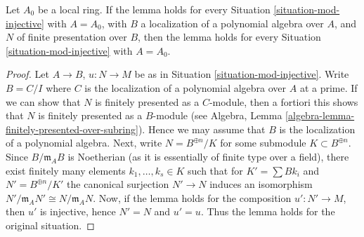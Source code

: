 \begin{lemma}
\label{lemma-reduce-finite-type-injective-into-flat-mod-m}
Let $A_0$ be a local ring. If the lemma holds for every
Situation \ref{situation-mod-injective} with $A = A_0$, with $B$ a
localization of a polynomial algebra over $A$, and $N$ of finite presentation
over $B$, then the lemma holds for every
Situation \ref{situation-mod-injective} with $A = A_0$.
\end{lemma}

\begin{proof}
Let $A \to B$, $u : N \to M$ be as in Situation \ref{situation-mod-injective}.
Write $B = C/I$ where $C$ is the localization of a polynomial algebra
over $A$ at a prime. If we can show that $N$ is finitely presented as
a $C$-module, then a fortiori this shows that $N$ is finitely presented
as a $B$-module (see
Algebra, Lemma \ref{algebra-lemma-finitely-presented-over-subring}).
Hence we may assume that $B$ is the localization of a polynomial algebra.
Next, write $N = B^{\oplus n}/K$ for some submodule $K \subset B^{\oplus n}$.
Since $B/\mathfrak m_AB$ is Noetherian (as it is essentially of finite type
over a field), there exist finitely many elements $k_1, \ldots, k_s \in K$
such that for $K' = \sum Bk_i$ and $N' = B^{\oplus n}/K'$ the
canonical surjection $N' \to N$ induces an isomorphism
$N'/\mathfrak m_AN' \cong N/\mathfrak m_AN$.
Now, if the lemma holds for the composition $u' : N' \to M$,
then $u'$ is injective, hence $N' = N$ and $u' = u$. Thus the lemma holds for
the original situation.
\end{proof}
